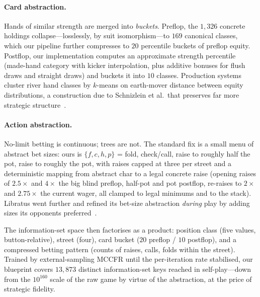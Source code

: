 \paragraph{Card abstraction.} Hands of similar strength are merged into \emph{buckets}. Preflop, the $1{,}326$ concrete holdings collapse---losslessly, by suit isomorphism---to $169$ canonical classes, which our pipeline further compresses to $20$ percentile buckets of preflop equity. Postflop, our implementation computes an approximate strength percentile (made-hand category with kicker interpolation, plus additive bonuses for flush draws and straight draws) and buckets it into $10$ classes. Production systems cluster river hand classes by $k$-means on earth-mover distance between equity distributions, a construction due to Schnizlein et al.~that preserves far more strategic structure~\cite{schnizlein2012card}.

\paragraph{Action abstraction.} No-limit betting is continuous; trees are not. The standard fix is a small menu of abstract bet sizes: ours is $\{f, c, h, p\}$ = fold, check/call, raise to roughly half the pot, raise to roughly the pot, with raises capped at three per street and a deterministic mapping from abstract char to a legal concrete raise (opening raises of $2.5\times$ and $4\times$ the big blind preflop, half-pot and pot postflop, re-raises to $2\times$ and $2.75\times$ the current wager, all clamped to legal minimums and to the stack). Libratus went further and refined its bet-size abstraction \emph{during} play by adding sizes its opponents preferred~\cite{brown2017libratus}.

The information-set space then factorises as a product: position class (five values, button-relative), street (four), card bucket ($20$ preflop / $10$ postflop), and a compressed betting pattern (counts of raises, calls, folds within the street). Trained by external-sampling MCCFR until the per-iteration rate stabilised, our blueprint covers $13{,}873$ distinct information-set keys reached in self-play---down from the $10^{160}$ scale of the raw game by virtue of the abstraction, at the price of strategic fidelity.

